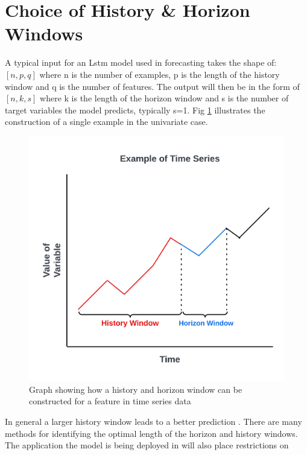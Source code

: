 \section{Choice of History \& Horizon Windows}
A typical input for an Lstm model used in forecasting takes the shape of: $[ n, p, q ]$ where n is the number of examples, p is the length of the history window and q is the number of features. The output will then be in the form of $[n, k, s ]$ where k is the length of the horizon window and s is the number of target variables the model predicts, typically s=1. Fig \ref{fig:example_of_ts} illustrates the construction of a single example in the univariate case.

\begin{figure}[h]
\includegraphics[scale=0.15]{History Horizon.png}
\caption{Graph showing how a history and horizon window can be constructed for a feature in time series data}
\label{fig:example_of_ts}
\end{figure}

In general a larger history window leads to a better prediction \cite{}. There are many methods for identifying the optimal length of the horizon and history windows. The application the model is being deployed in will also place restrictions on 


